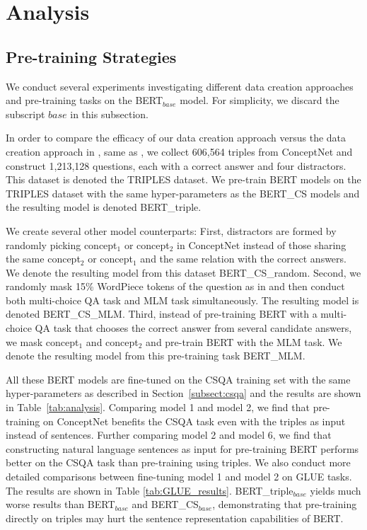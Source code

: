 \documentclass[11pt,a4paper]{article}
\begin{document}
\section{Analysis}
\subsection{Pre-training Strategies}
We conduct several experiments investigating different data creation approaches and pre-training tasks on the BERT$_{base}$ model.
For simplicity, we discard the subscript $base$ in this subsection.

In order to compare the efficacy of our data creation approach versus the data creation approach in \citet{sun2019probing},
same as \citet{sun2019probing}, we collect 606,564 triples from ConceptNet and construct 1,213,128 questions, each with a correct answer and four distractors. This dataset is denoted the TRIPLES dataset.
We pre-train BERT models on the TRIPLES dataset with the same hyper-parameters as the BERT\_CS models and the resulting model is denoted BERT\_triple.

We create several other model counterparts:
First, distractors are formed by randomly picking concept$_1$ or concept$_2$ in ConceptNet instead of those sharing the same concept$_2$ or concept$_1$ and the same relation with the correct answers. We denote the resulting model from this dataset BERT\_CS\_random.
Second, we randomly mask 15\% WordPiece tokens \citep{wu2016google} of the question as in \citet{devlin-etal-2019-bert} and then conduct both multi-choice QA task and MLM task simultaneously.  The resulting model is denoted BERT\_CS\_MLM.
Third, instead of pre-training BERT with a multi-choice QA task that chooses the correct answer from several candidate answers, we mask concept$_1$ and concept$_2$ and pre-train BERT with the MLM task. We denote the resulting model from this pre-training task BERT\_MLM.



All these BERT models are fine-tuned on the CSQA training set with the same hyper-parameters as described in Section~\ref{subsect:csqa} and the results are shown in Table~\ref{tab:analysis}.
Comparing model 1 and model 2, we find that pre-training on ConceptNet benefits the CSQA task even with the triples as input instead of sentences. 
Further comparing model 2 and model 6, we find that constructing natural language sentences as input for pre-training BERT performs better on the CSQA task than pre-training using triples. 
We also conduct more detailed comparisons between fine-tuning model 1 and model 2 on GLUE tasks. 
The results are shown in Table \ref{tab:GLUE_results}.
BERT\_triple$_{base}$ yields much worse results than BERT$_{base}$ and BERT\_CS$_{base}$, demonstrating that pre-training directly on triples may hurt the sentence representation capabilities of BERT. 
\end{document}
